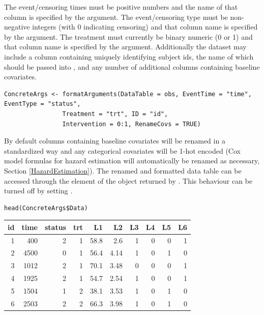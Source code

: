 \documentclass{report}
\newcommand{\1}{\ensuremath{\mathbf{1}}}
\begin{document}
The event/censoring times must be positive numbers and the name of that column is specified by the  argument. The event/censoring type must be non-negative integers (with 0 indicating censoring) and that column name is specified by the  argument. The treatment must currently be binary numeric (0 or 1) and that column name is specified by the  argument. Additionally the dataset may include a column containing uniquely identifying subject ids, the name of which should be passed into , and any number of additional columns containing baseline covariates.

\begin{lstlisting}
ConcreteArgs <- formatArguments(DataTable = obs, EventTime = "time", EventType = "status", 
				Treatment = "trt", ID = "id",
				Intervention = 0:1, RenameCovs = TRUE)
\end{lstlisting}

By default columns containing baseline covariates will be renamed in a standardized way and any categorical covariates will be 1-hot encoded (Cox model formulas for hazard estimation will automatically be renamed as necessary, Section \ref{HazardEstimation}). The renamed and formatted data table can be accessed through the  element of the  object returned by . This behaviour can be turned off by setting .

\begin{lstlisting}
head(ConcreteArgs$Data)
\end{lstlisting}

\begin{center}
\begin{tabular}{rrrrrrrrrr}
id & time & status & trt & L1 & L2 & L3 & L4 & L5 & L6\\
\hline
1 & 400 & 2 & 1 & 58.8 & 2.6 & 1 & 0 & 0 & 1\\
2 & 4500 & 0 & 1 & 56.4 & 4.14 & 1 & 0 & 1 & 0\\
3 & 1012 & 2 & 1 & 70.1 & 3.48 & 0 & 0 & 0 & 1\\
4 & 1925 & 2 & 1 & 54.7 & 2.54 & 1 & 0 & 0 & 1\\
5 & 1504 & 1 & 2 & 38.1 & 3.53 & 1 & 0 & 1 & 0\\
6 & 2503 & 2 & 2 & 66.3 & 3.98 & 1 & 0 & 1 & 0\\
\end{tabular}
\end{center}
\end{document}
